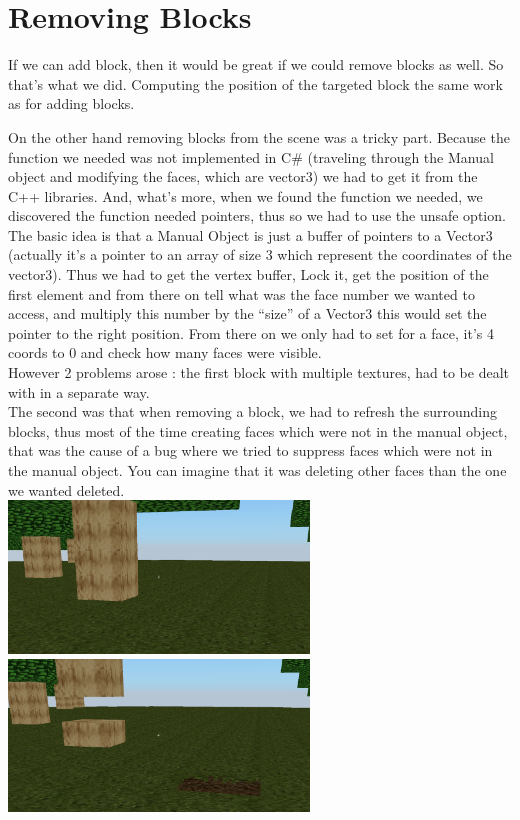 \documentclass[article]{report}             %
\begin{document}
				
				
			\section{Removing Blocks}
				If we can add block, then it would be great if we could remove blocks as well. So that's what we did. Computing the position of the targeted block the same work as for adding blocks.

				On the other hand removing blocks from the scene was a tricky part. Because the function we needed was not implemented in C\# (traveling through the Manual object and modifying the faces, which are vector3) we had to get it from the C++ libraries. And, what's more, when we found the function we needed, we discovered the function needed pointers, thus so we had to use the unsafe option.\\

				The basic idea is that a Manual Object is just a buffer of pointers to a Vector3 (actually it's a pointer to an array of size 3 which represent the coordinates of the vector3). Thus we had to get the vertex buffer, Lock it, get the position of the first element and from there on tell what was the face number we wanted to access, and multiply this number by the \enquote{size} of a Vector3 this would set the pointer to the right position. From there on we only had to set for a face, it's 4 coords to 0 and check how many faces were visible.\\

				However 2 problems arose : the first block with multiple textures, had to be dealt with in a separate way. \\
				The second was that when removing a block, we had to refresh the surrounding blocks, thus most of the time creating faces which were not in the manual object, that was the cause of a bug where we tried to suppress faces which were not in the manual object. You can imagine that it was deleting other faces than the one we wanted deleted.\\

				\includegraphics[width = 8cm]{images/Graphics/before.png}		
				\includegraphics[width = 8cm]{images/Graphics/after.png} \\
\end{document}
